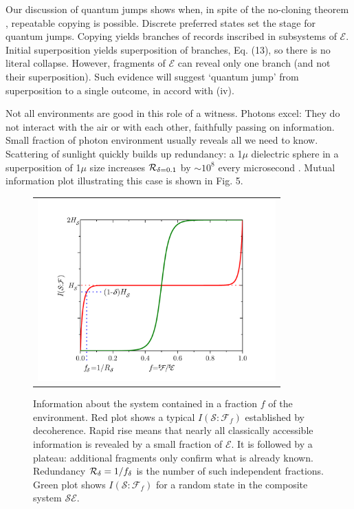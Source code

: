 \documentclass[aps,amsmath,amssymb,amsfonts,floatfix]{revtex4-1}
\newcommand{\cS}        {{\mathcal S}}
\newcommand{\cE}        {{\mathcal E}}
\newcommand{\+}         {\dagger}
\newcommand\cF{{\mathcal F}}
\begin{document}
{{Our discussion of quantum jumps shows when, in spite of the no-cloning theorem \cite{65,24}, repeatable copying is possible. Discrete preferred states set the stage for quantum jumps.
Copying yields branches of records inscribed in subsystems of $\cE$. Initial superposition yields superposition of branches, Eq. (13), so there is no literal collapse.
However, fragments of $\cE$ can reveal only one branch (and not their superposition). Such evidence will suggest `quantum jump' from superposition to a single outcome, in accord with (iv).

Not all environments are good in this role of a witness. Photons excel: They do not interact with the air or with each other, faithfully passing on information. Small fraction of photon environment usually reveals all we need to know. Scattering of sunlight quickly builds up redundancy: a 1$\mu$ dielectric sphere in a superposition of 1$\mu$ size increases ${\cal R}_{\delta=0.1}$ by $ \sim 10^8$ every microsecond \cite{RiedelZ10, RiedelZ12}. Mutual information plot illustrating this case is shown in Fig. 5.

{\begin{figure}[tb]
\begin{tabular}{l}
\vspace{-0.15in} 
\includegraphics[width=3.6in]{MIPlot.pdf}\\
\end{tabular}
\caption{Information about the system contained in a fraction $f$ of the environment. Red plot shows a typical $I(\cS : \cF_f)$ established by decoherence. Rapid rise means that nearly all classically accessible information is revealed by a small fraction of $\cE$. It is followed by a plateau: additional fragments only confirm what is already known. Redundancy ${\cal R_\delta} = 1 / f_\delta$ is the number of such independent fractions. Green plot shows $I(\cS : \cF_f)$ for a random state in the composite system ${\cS\cE}$.
}
\label{RedPIP}
\end{figure}


}}}
\end{document}
